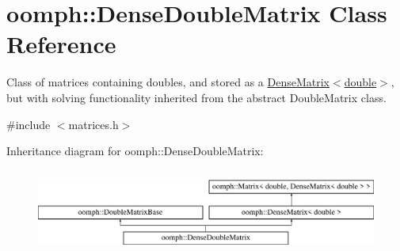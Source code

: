 \hypertarget{classoomph_1_1DenseDoubleMatrix}{}\section{oomph\+:\+:Dense\+Double\+Matrix Class Reference}
\label{classoomph_1_1DenseDoubleMatrix}


Class of matrices containing doubles, and stored as a \hyperlink{classoomph_1_1DenseMatrix}{Dense\+Matrix$<$double$>$}, but with solving functionality inherited from the abstract Double\+Matrix class.  




{\ttfamily \#include $<$matrices.\+h$>$}

Inheritance diagram for oomph\+:\+:Dense\+Double\+Matrix\+:\begin{figure}[H]
\begin{center}
\leavevmode
\includegraphics[height=2.781457cm]{classoomph_1_1DenseDoubleMatrix}
\end{center}
\end{figure}

